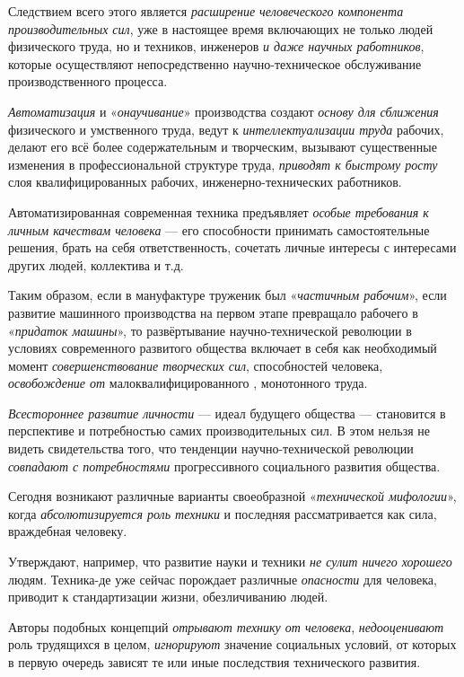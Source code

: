 \documentclass[a4paper,14pt,russian]{extreport}
\begin{document}
Следствием всего этого является \emph{расширение человеческого компонента производительных сил}, уже в настоящее время включающих не только людей физического труда, но и техников, инженеров \emph{и даже научных работников}, которые осуществляют непосредственно научно-техническое обслуживание производственного процесса.

\emph{Автоматизация} и «\emph{онаучивание}» производства создают \emph{основу для сближения} физического и умственного труда, ведут к \emph{интеллектуализации труда} рабочих, делают его всё более содержательным и творческим, вызывают существенные изменения в профессиональной структуре труда, \emph{приводят к быстрому росту} слоя квалифицированных рабочих, инженерно-технических работников.

Автоматизированная современная техника предъявляет \emph{особые требования к личным качествам человека} --- его способности принимать самостоятельные решения, брать на себя ответственность, сочетать личные интересы с интересами других людей, коллектива и т.д.

Таким образом, если в мануфактуре труженик был «\emph{частичным рабочим}», если развитие машинного производства на первом этапе превращало рабочего в «\emph{придаток машины}», то развёртывание научно-технической революции в условиях современного развитого общества включает в себя как необходимый момент \emph{совершенствование творческих сил}, способностей человека, \emph{освобождение от} малоквалифицированного , монотонного труда.

\emph{Всестороннее развитие личности} --- идеал будущего общества --- становится в перспективе и потребностью самих производительных сил. В этом нельзя не видеть свидетельства того, что тенденции научно-технической революции \emph{совпадают с потребностями} прогрессивного социального развития общества.

Сегодня возникают различные варианты своеобразной «\emph{технической мифологии}», когда \emph{абсолютизируется роль техники} и последняя рассматривается как сила, враждебная человеку.

Утверждают, например, что развитие науки и техники \emph{не сулит ничего хорошего} людям. Техника-де уже сейчас порождает различные \emph{опасности} для человека, приводит к стандартизации жизни, обезличиванию людей.

Авторы подобных концепций \emph{отрывают технику от человека}, \emph{недооценивают} роль трудящихся в целом, \emph{игнорируют} значение социальных условий, от которых в первую очередь зависят те или иные последствия технического развития.
\end{document}
